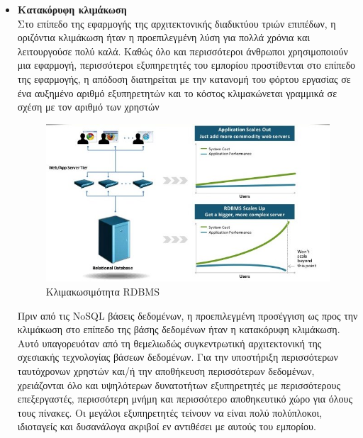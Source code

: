 		\begin{itemize}
			\item {\textbf{Κατακόρυφη κλιμάκωση}}\\
			Στο επίπεδο της εφαρμογής της αρχιτεκτονικής διαδικτύου τριών επιπέδων, η οριζόντια κλιμάκωση ήταν η προεπιλεγμένη λύση για πολλά χρόνια και λειτουργούσε πολύ καλά. Καθώς όλο και περισσότεροι άνθρωποι χρησιμοποιούν μια εφαρμογή, περισσότεροι εξυπηρετητές του εμπορίου προστίθενται στο επίπεδο της εφαρμογής, η απόδοση διατηρείται με την κατανομή του φόρτου εργασίας σε ένα αυξημένο αριθμό εξυπηρετητών και το κόστος κλιμακώνεται γραμμικά σε σχέση με τον αριθμό των χρηστών
			
	\begin{figure}[h]
	    \centering
	    \includegraphics[width=1\textwidth]{RDBMS_scales_up.jpg}
	    \caption{Κλιμακωσιμότητα RDBMS}
	    \label{fig:RDBMS_scales_up}
	\end{figure}	
			
			Πριν από τις NoSQL βάσεις δεδομένων, η προεπιλεγμένη προσέγγιση ως προς την κλιμάκωση στο επίπεδο της βάσης δεδομένων ήταν η κατακόρυφη κλιμάκωση. Αυτό υπαγορευόταν από τη θεμελιωδώς συγκεντρωτική αρχιτεκτονική της σχεσιακής τεχνολογίας βάσεων δεδομένων. Για την υποστήριξη περισσότερων ταυτόχρονων χρηστών και/ή την αποθήκευση περισσότερων δεδομένων, χρειάζονται όλο και υψηλότερων δυνατοτήτων εξυπηρετητές με περισσότερους επεξεργαστές, περισσότερη μνήμη και περισσότερο αποθηκευτικό χώρο για όλους τους πίνακες. Οι μεγάλοι εξυπηρετητές τείνουν να είναι πολύ πολύπλοκοι, ιδιοταγείς και δυσανάλογα ακριβοί εν αντιθέσει με αυτούς του εμπορίου.	
				

\end{itemize}
